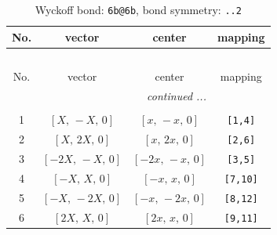 \documentclass[fleqn,8pt]{jsarticle}
\begin{document}
\begin{longtable}{cccc}
\caption{Wyckoff bond: {\tt 6b@6b}, bond symmetry: {\tt ..2}}
 \\
 \hline \hline
No. & vector & center & mapping \\ \hline \endfirsthead

\multicolumn{3}{l}{\tablename\ \thetable{}} \\
 \hline \hline
No. & vector & center & mapping \\ \hline \endhead

 \hline \hline
\multicolumn{3}{r}{\footnotesize\it continued ...} \\ \endfoot

 \hline \hline
\multicolumn{3}{r}{} \\ \endlastfoot

1 & $\left[ X,\, - X,\, 0 \right]$ & $\left[ x,\, - x,\, 0 \right]$ & {\tt [1,4]} \\ \hline
2 & $\left[ X,\, 2 X,\, 0 \right]$ & $\left[ x,\, 2 x,\, 0 \right]$ & {\tt [2,6]} \\ \hline
3 & $\left[ - 2 X,\, - X,\, 0 \right]$ & $\left[ - 2 x,\, - x,\, 0 \right]$ & {\tt [3,5]} \\ \hline
4 & $\left[ - X,\, X,\, 0 \right]$ & $\left[ - x,\, x,\, 0 \right]$ & {\tt [7,10]} \\ \hline
5 & $\left[ - X,\, - 2 X,\, 0 \right]$ & $\left[ - x,\, - 2 x,\, 0 \right]$ & {\tt [8,12]} \\ \hline
6 & $\left[ 2 X,\, X,\, 0 \right]$ & $\left[ 2 x,\, x,\, 0 \right]$ & {\tt [9,11]} \\
\end{longtable}
\renewcommand{\arraystretch}{1.2}
\end{document}
